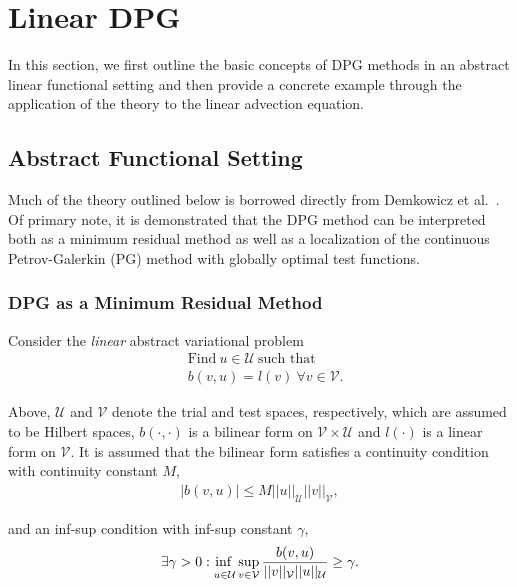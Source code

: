 \section{Linear DPG} \label{sec:dpg_linear}

In this section, we first outline the basic concepts of DPG methods in an abstract linear functional setting and then
provide a concrete example through the application of the theory to the linear advection equation.

\subsection{Abstract Functional Setting}

Much of the theory outlined below is borrowed directly from Demkowicz et al.~\cite{Demkowicz2014_overview}. Of primary
note, it is demonstrated that the DPG method can be interpreted both as a minimum residual method as well as a
localization of the continuous Petrov-Galerkin (PG) method with globally optimal test functions.

\subsubsection{DPG as a Minimum Residual Method}

Consider the \textit{linear} abstract variational problem
\begin{align}
& \text{Find}\ u \in \mathcal{U}\ \text{such that}\\
& b(v,u) = l(v)\ \forall v \in \mathcal{V}.
\end{align}

Above, $\mathcal{U}$ and $\mathcal{V}$ denote the trial and test spaces, respectively, which are assumed to be Hilbert spaces, $b(\cdot,\cdot)$ is a bilinear form on $\mathcal{V} \times \mathcal{U}$ and $l(\cdot)$ is a linear form on $\mathcal{V}$. It is assumed that the bilinear form satisfies a continuity condition with continuity constant $M$,
\begin{align}
| b(v,u) | \le M ||u||_{\mathcal{U}} ||v||_{\mathcal{V}},
\end{align}

and an inf-sup condition with inf-sup constant $\gamma$,
\begin{align}
\exists \gamma > 0 : \adjustlimits\inf_{u\in\mathcal{U}} \sup_{v\in\mathcal{V}} \frac{b(v,u)}{||v||_{\mathcal{V}}||u||_{\mathcal{U}}} \ge \gamma.
\end{align}

